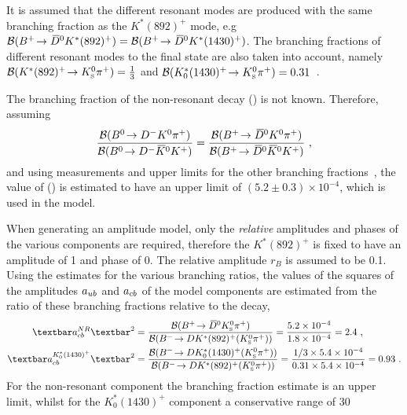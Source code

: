 It is assumed that the different resonant \Kstarp modes are produced with the same branching fraction as the $K^*(892)^+$ mode, e.g ${\mathcal{B}}({{{B}^+}}\!\rightarrow {\ensuremath{{\kern 0.2em\overline{\kern -0.2em D}{}}{}^0}} K^*(892)^+) = {\mathcal{B}}({{{B}^+}}\!\rightarrow {\ensuremath{{\kern 0.2em\overline{\kern -0.2em D}{}}{}^0}} K^*(1430)^+)$. The branching fractions of different resonant \Kstarp modes to the \KS\pip final state are also taken into account, namely ${\mathcal{B}}(K^*(892)^+\!\rightarrow {\ensuremath{{K}^0_{\mathrm{ \scriptscriptstyle S}}}}{\ensuremath{{\pi}^+}}) = \frac{1}{3}$ and ${\mathcal{B}}(K^*_0(1430)^+\!\rightarrow {\ensuremath{{K}^0_{\mathrm{ \scriptscriptstyle S}}}}{\ensuremath{{\pi}^+}}) = 0.31$~\cite{PDG2016}.

The branching fraction of the non-resonant decay \BR(\decay{\Bp}{\Dzb\KS\pip}) is not known. Therefore, assuming
\begin{equation*}
\frac{{\mathcal{B}}({{B}^0}\!\rightarrow {\ensuremath{{D}^-}}{\ensuremath{{K}^0}}{\ensuremath{{\pi}^+}})}{{\mathcal{B}}({{B}^0}\!\rightarrow {\ensuremath{{D}^-}}{\ensuremath{{\kern 0.2em\overline{\kern -0.2em K}{}}{}^0}}{\ensuremath{{K}^+}})} = \frac{{\mathcal{B}}({{{B}^+}}\!\rightarrow {\ensuremath{{\kern 0.2em\overline{\kern -0.2em D}{}}{}^0}}{\ensuremath{{K}^0}}{\ensuremath{{\pi}^+}})}{{\mathcal{B}}({{{B}^+}}\!\rightarrow {\ensuremath{{\kern 0.2em\overline{\kern -0.2em D}{}}{}^0}}{\ensuremath{{\kern 0.2em\overline{\kern -0.2em K}{}}{}^0}}{\ensuremath{{K}^+}})} \text{ ,}
\end{equation*}
and using measurements and upper limits for the other branching fractions~\cite{PDG2014}, the value of \BR(\decay{\Bp}{\Dzb\KS\pip}) is estimated to have an upper limit of $(5.2 \pm 0.3) \times 10^{-4}$, which is used in the model.

When generating an amplitude model, only the \textit{relative} amplitudes and phases of the various components are required, therefore the $K^*(892)^+$ is fixed to have an amplitude of 1 and phase of 0. The relative amplitude $r_B$ is assumed to be 0.1. Using the estimates for the various branching ratios, the values of the squares of the amplitudes $a_{{u}{b}}$ and $a_{{c}{b}}$ of the model components are estimated from the ratio of these branching fractions relative to the  decay,
\begin{align*}
\textbar a_{\cquark\bquark}^{NR}\textbar^2 &= \frac{\BR(\decay{\Bp}{\Dzb\KS\pip})}{\BR(\decay{\Bm}{\D K^*(892)^+(\KS\pip)})} = \frac{5.2 \times 10^{-4}}{1.8 \times 10^{-4}} = 2.4 \text{ ,} \\
\textbar a_{\cquark\bquark}^{K^*_0(1430)^+}\textbar^2 &= \frac{\BR(\decay{\Bm}{\D K^*_0(1430)^+(\KS\pip)})}{\BR(\decay{\Bm}{\D K^*(892)^+(\KS\pip)})} = \frac{1/3 \times 5.4 \times 10^{-4}}{0.31 \times 5.4 \times 10^{-4}} = 0.93 \text{ .}
\end{align*}
For the non-resonant component the branching fraction estimate is an upper limit, whilst for the $K^*_0(1430)^+$  component a conservative range of 30%

